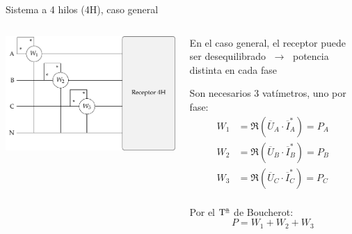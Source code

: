\documentclass[aspectratio=169, usenames,svgnames,dvipsnames]{beamer}
\begin{document}

\begin{frame}{Sistema a 4 hilos (4H), \hspace{3mm} caso general}
    \begin{columns}
    \begin{column}{0.65\columnwidth}
    
        \vspace{6mm}
        \includegraphics[height=0.75\textheight]{../figs/Potencia4H.pdf}
    \end{column}
    
    \begin{column}{0.35\columnwidth}
        En el caso general, el receptor puede ser \alert{desequilibrado} $\; \rightarrow \;$ \alert{potencia distinta} en cada fase

        \vspace{4mm}
        Son necesarios \alert{3 vatímetros}, uno por fase:
        \begin{align*}
          W_1 &= \Re(\overline{U}_A \cdot \overline{I}_A^*) = P_A\\
          W_2 &= \Re(\overline{U}_B \cdot \overline{I}_B^*) = P_B\\
          W_3 &= \Re(\overline{U}_C \cdot \overline{I}_C^*) = P_C\\
        \end{align*}

        \vspace{-2mm}
        Por el $\mbox{T}^{\textrm{\underline{a}}}$ de \alert{Boucherot}:        
        \[
          \boxed{\; P = W_1 + W_2 + W_3 \;}
        \]
    \end{column}
    \end{columns}
\end{frame}
\end{document}
